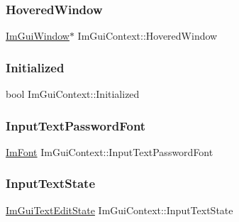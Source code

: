 \hypertarget{struct_im_gui_context_a6dd89693704216a036d2676b8c6610f8}{}\label{struct_im_gui_context_a6dd89693704216a036d2676b8c6610f8} 
\subsubsection{\texorpdfstring{Hovered\+Window}{HoveredWindow}}
{\footnotesize\ttfamily \hyperlink{struct_im_gui_window}{Im\+Gui\+Window}$\ast$ Im\+Gui\+Context\+::\+Hovered\+Window}

\hypertarget{struct_im_gui_context_a71b32432f5c4658b4772b293640a66c0}{}\label{struct_im_gui_context_a71b32432f5c4658b4772b293640a66c0} 
\subsubsection{\texorpdfstring{Initialized}{Initialized}}
{\footnotesize\ttfamily bool Im\+Gui\+Context\+::\+Initialized}

\hypertarget{struct_im_gui_context_a6aa67b9b778bd741d9866ec34cc8ee8b}{}\label{struct_im_gui_context_a6aa67b9b778bd741d9866ec34cc8ee8b} 
\subsubsection{\texorpdfstring{Input\+Text\+Password\+Font}{InputTextPasswordFont}}
{\footnotesize\ttfamily \hyperlink{struct_im_font}{Im\+Font} Im\+Gui\+Context\+::\+Input\+Text\+Password\+Font}

\hypertarget{struct_im_gui_context_ae8626ef18bc5a848691a0c50e2c0f7ae}{}\label{struct_im_gui_context_ae8626ef18bc5a848691a0c50e2c0f7ae} 
\subsubsection{\texorpdfstring{Input\+Text\+State}{InputTextState}}
{\footnotesize\ttfamily \hyperlink{struct_im_gui_text_edit_state}{Im\+Gui\+Text\+Edit\+State} Im\+Gui\+Context\+::\+Input\+Text\+State}


